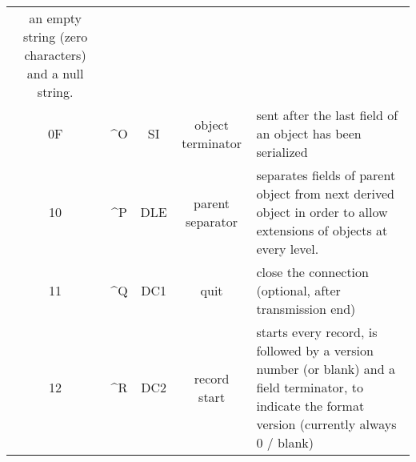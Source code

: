 \documentclass[11pt,a4paper,oneside]{article}
\begin{document}
\begin{tabular}{|c|c|c|c|p{8cm}|}
an empty string (zero characters) and a null string.\\
0F & \textasciicircum O & SI &
object terminator & sent after the last field of an object has been serialized\\
10 & \textasciicircum P & DLE & parent separator   & separates fields of parent object
from next derived object in order to allow extensions of objects at every level.\\
11 & \textasciicircum Q & DC1 & quit      & close the connection (optional, after
transmission end)
\\
12 & \textasciicircum R & DC2 & record start       & starts every record, is
followed by a version number (or blank) and a field terminator, to indicate
the format version (currently always 0 / blank) \\
\hline
\end{tabular}
\end{document}
